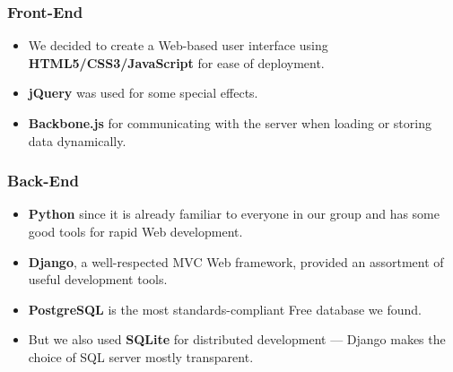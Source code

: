 
\begin{frame}
  \frametitle{Front-End}

  \begin{itemize}[<+>]
    \item We decided to create a Web-based user interface using
      \textbf{HTML5/CSS3/JavaScript} for ease of deployment.

    \item \textbf{jQuery} was used for some special effects.

    \item \textbf{Backbone.js} for communicating with the server when
      loading or storing data dynamically.
  \end{itemize}
\end{frame}

\begin{frame}
  \frametitle{Back-End}

  \begin{itemize}[<+>]
    \item \textbf{Python} since it is already familiar to everyone in
      our group and has some good tools for rapid Web development.

    \item \textbf{Django}, a well-respected MVC Web framework,
      provided an assortment of useful development tools.

    \item \textbf{PostgreSQL} is the most standards-compliant Free database we
      found.

    \item But we also used \textbf{SQLite} for distributed development ---
      Django makes the choice of SQL server mostly transparent.
  \end{itemize}
\end{frame}
